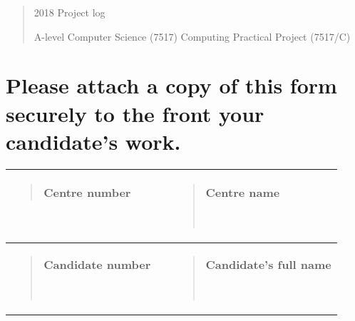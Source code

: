 \documentclass[
]{article}
\date{}
\begin{document}
\begin{quote}
2018 Project log

A-level Computer Science (7517) Computing Practical Project (7517/C)
\end{quote}

\hypertarget{please-attach-a-copy-of-this-form-securely-to-the-front-your-candidates-work.}{%
\section{Please attach a copy of this form securely to the front your
candidate's
work.}\label{please-attach-a-copy-of-this-form-securely-to-the-front-your-candidates-work.}}

\begin{longtable}[]{@{}lll@{}}
\toprule
\begin{minipage}[b]{0.30\columnwidth}\raggedright
\begin{quote}
\textbf{Centre number}
\end{quote}

     \strut
\end{minipage} & \begin{minipage}[b]{0.30\columnwidth}\raggedright
\strut
\end{minipage} & \begin{minipage}[b]{0.30\columnwidth}\raggedright
\begin{quote}
\textbf{Centre name}

     
\end{quote}\strut
\end{minipage}\tabularnewline
\midrule
\endhead
\begin{minipage}[t]{0.30\columnwidth}\raggedright
\begin{quote}
\textbf{Candidate number}

     
\end{quote}\strut
\end{minipage} & \begin{minipage}[t]{0.30\columnwidth}\raggedright
\strut
\end{minipage} & \begin{minipage}[t]{0.30\columnwidth}\raggedright
\begin{quote}
\textbf{Candidate's full name}

     
\end{quote}\strut
\end{minipage}\tabularnewline
\bottomrule
\end{longtable}
\end{document}
